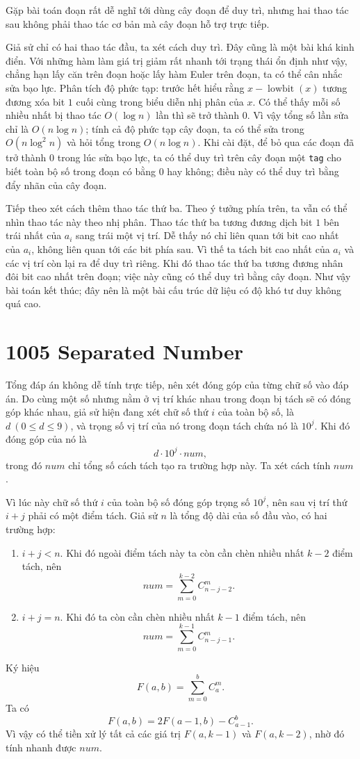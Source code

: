 \documentclass[11pt]{article}
\begin{document}
Gặp bài toán đoạn rất dễ nghĩ tới dùng cây đoạn để duy trì, nhưng hai thao tác
sau không phải thao tác cơ bản mà cây đoạn hỗ trợ trực tiếp.

Giả sử chỉ có hai thao tác đầu, ta xét cách duy trì. Đây cũng là một bài khá
kinh điển. Với những hàm làm giá trị giảm rất nhanh tới trạng thái ổn định
như vậy, chẳng hạn lấy căn trên đoạn hoặc lấy hàm Euler trên đoạn, ta có thể
cân nhắc sửa bạo lực. Phân tích độ phức tạp: trước hết hiểu rằng
$x-\operatorname{lowbit}(x)$ tương đương xóa bit $1$ cuối cùng trong biểu diễn
nhị phân của $x$. Có thể thấy mỗi số nhiều nhất bị thao tác $O(\log n)$ lần
thì sẽ trở thành $0$. Vì vậy tổng số lần sửa chỉ là $O(n\log n)$; tính cả độ
phức tạp cây đoạn, ta có thể sửa trong $O(n\log^2 n)$ và hỏi tổng trong
$O(n\log n)$. Khi cài đặt, để bỏ qua các đoạn đã trở thành $0$ trong lúc sửa
bạo lực, ta có thể duy trì trên cây đoạn một \texttt{tag} cho biết toàn bộ số
trong đoạn có bằng $0$ hay không; điều này có thể duy trì bằng đẩy nhãn của
cây đoạn.

Tiếp theo xét cách thêm thao tác thứ ba. Theo ý tưởng phía trên, ta vẫn có thể
nhìn thao tác này theo nhị phân. Thao tác thứ ba tương đương dịch bit $1$ bên
trái nhất của $a_i$ sang trái một vị trí. Dễ thấy nó chỉ liên quan tới bit cao
nhất của $a_i$, không liên quan tới các bit phía sau. Vì thế ta tách bit cao
nhất của $a_i$ và các vị trí còn lại ra để duy trì riêng. Khi đó thao tác thứ
ba tương đương nhân đôi bit cao nhất trên đoạn; việc này cũng có thể duy trì
bằng cây đoạn. Như vậy bài toán kết thúc; đây nên là một bài cấu trúc dữ liệu
có độ khó tư duy không quá cao.

\section*{1005 Separated Number}

Tổng đáp án không dễ tính trực tiếp, nên xét đóng góp của từng chữ số vào đáp
án. Do cùng một số nhưng nằm ở vị trí khác nhau trong đoạn bị tách sẽ có đóng
góp khác nhau, giả sử hiện đang xét chữ số thứ $i$ của toàn bộ số, là
$d\ (0\le d\le 9)$, và trọng số vị trí của nó trong đoạn tách chứa nó là
$10^j$. Khi đó đóng góp của nó là
\[
  d\cdot 10^j\cdot \mathit{num},
\]
trong đó $\mathit{num}$ chỉ tổng số cách tách tạo ra trường hợp này. Ta xét
cách tính $\mathit{num}$.

Vì lúc này chữ số thứ $i$ của toàn bộ số đóng góp trọng số $10^j$, nên sau vị
trí thứ $i+j$ phải có một điểm tách. Giả sử $n$ là tổng độ dài của số đầu vào,
có hai trường hợp:
\begin{enumerate}
  \item $i+j<n$. Khi đó ngoài điểm tách này ta còn cần chèn nhiều nhất
  $k-2$ điểm tách, nên
  \[
    \mathit{num}=\sum_{m=0}^{k-2} C_{n-j-2}^{m}.
  \]
  \item $i+j=n$. Khi đó ta còn cần chèn nhiều nhất $k-1$ điểm tách, nên
  \[
    \mathit{num}=\sum_{m=0}^{k-1} C_{n-j-1}^{m}.
  \]
\end{enumerate}
Ký hiệu
\[
  F(a,b)=\sum_{m=0}^{b} C_a^m.
\]
Ta có
\[
  F(a,b)=2F(a-1,b)-C_{a-1}^{b}.
\]
Vì vậy có thể tiền xử lý tất cả các giá trị $F(a,k-1)$ và $F(a,k-2)$, nhờ đó
tính nhanh được $\mathit{num}$.
\end{document}
